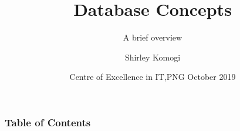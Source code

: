 \documentclass[hyperref={bookmarks=false},aspectratio=169]{beamer}
\title[Database Concepts]
{\bfseries{Database Concepts}}
\subtitle{A brief overview}
\author[Shirley Komogi] %
{Shirley Komogi\inst{1} } %
\institute[CEIT]
{
  \inst{1}
  Trainer\\
  Centre of Excellence in IT,PNG
}
\date[CEIT, 2014]
{Centre of Excellence in IT,PNG October 2019}
\begin{document}
\frame{\titlepage}  %

\begin{frame}
\frametitle{Table of Contents}
\tableofcontents
\end{frame}







\end{document}
